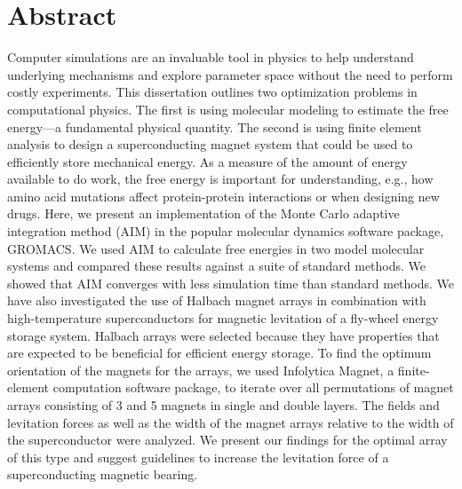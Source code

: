 
\section*{\large{Abstract}}

\begin{flushleft}

Computer simulations are an invaluable tool in physics to help understand underlying mechanisms and explore parameter space without the need to perform costly experiments. This dissertation outlines two optimization problems in computational physics. The first is using molecular modeling to estimate the free energy---a fundamental physical quantity. The second is using finite element analysis to design a superconducting magnet system that could be used to efficiently store mechanical energy. As a measure of the amount of energy available to do work, the free energy is important for understanding, e.g., how amino acid mutations affect protein-protein interactions or when designing new drugs. Here, we present an implementation of the Monte Carlo adaptive integration method (AIM) in the popular molecular dynamics software package, GROMACS. We used AIM to calculate free energies in two model molecular systems and compared these results against a suite of standard methods. We showed that AIM converges with less simulation time than standard methods. We have also investigated the use of Halbach magnet arrays in combination with high-temperature superconductors for magnetic levitation of a fly-wheel energy storage system. Halbach arrays were selected because they have properties that are expected to be beneficial for efficient energy storage. To find the optimum orientation of the magnets for the arrays, we used Infolytica Magnet, a finite-element computation software package, to iterate over all permutations of magnet arrays consisting of 3 and 5 magnets in single and double layers. The fields and levitation forces as well as the width of the magnet arrays relative to the width of the superconductor were analyzed. We present our findings for the optimal array of this type and suggest guidelines to increase the levitation force of a superconducting magnetic bearing. 

\end{flushleft}